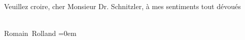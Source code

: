 \pstart
           \begin{otherlanguage}{french}Veuillez croire, cher Monsieur Dr. Schnitzler, à mes
                  sentiments tout dévoués\end{otherlanguage}{\\[\baselineskip]}\spacefill\mbox{Romain Rolland}\pend
           \leftskip=0em{}\endnumbering{}
\begin{anhang}
\end{anhang}
      